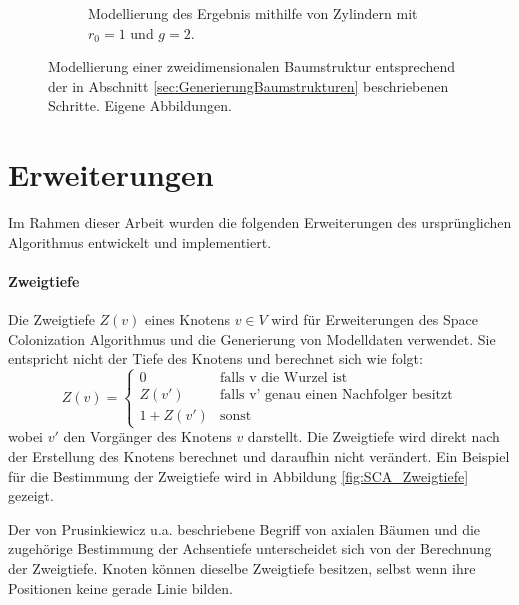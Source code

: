 \begin{figure} [hbtp]
\begin{subfigure}[t]{.4\textwidth}
		\caption{Modellierung des Ergebnis mithilfe von Zylindern mit $r_0 = 1$ und $g=2$.}
		\label{subfig:SCA_Extended4}
	\end{subfigure}
	\caption{Modellierung einer zweidimensionalen Baumstruktur entsprechend der in Abschnitt \ref{sec:GenerierungBaumstrukturen} beschriebenen Schritte. Eigene Abbildungen.}
	\label{fig:SCA_Extended}
\end{figure}

\section{Erweiterungen} \label{sec:SCA_Erweiterungen}

Im Rahmen dieser Arbeit wurden die folgenden Erweiterungen des ursprünglichen Algorithmus entwickelt und implementiert.

\paragraph{Zweigtiefe}

Die Zweigtiefe $Z(v)$ eines Knotens $v \in V$ wird für Erweiterungen des Space Colonization Algorithmus und die Generierung von Modelldaten verwendet. Sie entspricht nicht der Tiefe des Knotens und berechnet sich wie folgt:
\begin{equation}
Z(v)= \begin{cases}
0 & \text{falls v die Wurzel ist} \\
Z(v') & \text{falls v' genau einen Nachfolger besitzt}\\
1 + Z(v') & \text{sonst}
\end{cases} 
\end{equation}
wobei $v'$ den Vorgänger des Knotens $v$ darstellt. Die Zweigtiefe wird direkt nach der Erstellung des Knotens berechnet und daraufhin nicht verändert. Ein Beispiel für die Bestimmung der Zweigtiefe wird in Abbildung \ref{fig:SCA_Zweigtiefe} gezeigt.

Der von Prusinkiewicz u.a. \cite{ABOP:04} beschriebene Begriff von axialen Bäumen \cite[S.21]{ABOP:04} und die zugehörige Bestimmung der Achsentiefe unterscheidet sich von der Berechnung der Zweigtiefe. Knoten können dieselbe Zweigtiefe besitzen, selbst wenn ihre Positionen keine gerade Linie bilden.

